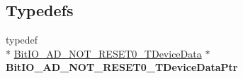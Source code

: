 \subsection*{Typedefs}
\begin{DoxyCompactItemize}
\item 
\hypertarget{group___bit_i_o___a_d___n_o_t___r_e_s_e_t0__module_ga38483492a322d2312509ae21faca761d}{typedef \\*
\hyperlink{struct_bit_i_o___a_d___n_o_t___r_e_s_e_t0___t_device_data}{Bit\-I\-O\-\_\-\-A\-D\-\_\-\-N\-O\-T\-\_\-\-R\-E\-S\-E\-T0\-\_\-\-T\-Device\-Data} $\ast$ {\bfseries Bit\-I\-O\-\_\-\-A\-D\-\_\-\-N\-O\-T\-\_\-\-R\-E\-S\-E\-T0\-\_\-\-T\-Device\-Data\-Ptr}}\label{group___bit_i_o___a_d___n_o_t___r_e_s_e_t0__module_ga38483492a322d2312509ae21faca761d}

\end{DoxyCompactItemize}
